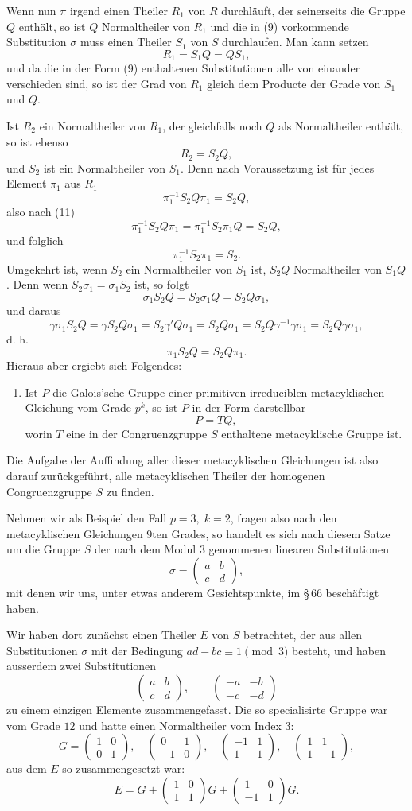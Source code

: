 \documentclass[11pt]{article}
\providecommand{\mat}[4]{\begin{pmatrix}#1&#2\\#3&#4\end{pmatrix}}
\providecommand{\mat}[4]{\begin{pmatrix}#1&#2\\#3&#4\end{pmatrix}}
\begin{document}
Wenn nun $\pi$ irgend einen Theiler $R_1$ von $R$ durchläuft, der seinerseits die Gruppe $Q$ enthält, so ist $Q$ Normaltheiler von $R_1$ und die in (9) vorkommende Substitution $\sigma$ muss einen Theiler $S_1$ von $S$ durchlaufen. Man kann setzen
\[
 R_1=S_1Q=QS_1,
\]
und da die in der Form (9) enthaltenen Substitutionen alle von einander verschieden sind, so ist der Grad von $R_1$ gleich dem Producte der Grade von $S_1$ und $Q$.

Ist $R_2$ ein Normaltheiler von $R_1$, der gleichfalls noch $Q$ als Normaltheiler enthält, so ist ebenso
\[
 R_2=S_2Q,
\]
und $S_2$ ist ein Normaltheiler von $S_1$. Denn nach Voraussetzung ist für jedes Element $\pi_1$ aus $R_1$
\[
 \pi_1^{-1}S_2Q\pi_1=S_2Q,
\]
also nach (11)
\[
 \pi_1^{-1}S_2Q\pi_1
 =\pi_1^{-1}S_2\pi_1 Q=S_2Q,
\]
und folglich
\[
 \pi_1^{-1}S_2\pi_1=S_2.
\]
Umgekehrt ist, wenn $S_2$ ein Normaltheiler von $S_1$ ist, $S_2Q$ Normaltheiler von $S_1Q$. Denn wenn $S_2\sigma_1=\sigma_1S_2$ ist, so folgt
\[
 \sigma_1S_2Q=S_2\sigma_1Q=S_2Q\sigma_1,
\]
und daraus
\[
 \gamma\sigma_1S_2Q=\gamma S_2Q\sigma_1=S_2\gamma'Q\sigma_1
 =S_2Q\sigma_1=S_2Q\gamma^{-1}\gamma\sigma_1=S_2Q\gamma\sigma_1,
\]
d. h.
\[
 \pi_1S_2Q=S_2Q\pi_1.
\]
Hieraus aber ergiebt sich Folgendes:

\begin{enumerate}[label=\Roman*.,leftmargin=2.8em,start=2]
\item Ist $P$ die Galois'sche Gruppe einer primitiven irreduciblen metacyklischen Gleichung vom Grade $p^k$, so ist $P$ in der Form darstellbar
\[
 P=TQ,
\]
worin $T$ eine in der Congruenzgruppe $S$ enthaltene metacyklische Gruppe ist.
\end{enumerate}

Die Aufgabe der Auffindung aller dieser metacyklischen Gleichungen ist also darauf zurückgeführt, alle metacyklischen Theiler der homogenen Congruenzgruppe $S$ zu finden.

Nehmen wir als Beispiel den Fall $p=3,\;k=2$, fragen also nach den metacyklischen Gleichungen $9$ten Grades, so handelt es sich nach diesem Satze um die Gruppe $S$ der nach dem Modul $3$ genommenen linearen Substitutionen
\begin{equation}
 \sigma=\mat{a}{b}{c}{d},
 \tag{12}
\end{equation}
mit denen wir uns, unter etwas anderem Gesichtspunkte, im \S\,66 beschäftigt haben.

Wir haben dort zunächst einen Theiler $E$ von $S$ betrachtet, der aus allen Substitutionen $\sigma$ mit der Bedingung $ad-bc\equiv 1\pmod 3$ besteht, und haben ausserdem zwei Substitutionen
\begin{equation}
 \mat{a}{b}{c}{d},\qquad
 \mat{-a}{-b}{-c}{-d}
 \tag{13}
\end{equation}
zu einem einzigen Elemente zusammengefasst. Die so specialisirte Gruppe war vom Grade $12$ und hatte einen Normaltheiler vom Index $3$:
\[
 G=
 \mat{1}{0}{0}{1},\quad
 \mat{0}{1}{-1}{0},\quad
 \mat{-1}{1}{1}{1},\quad
 \mat{1}{1}{1}{-1},
\]
aus dem $E$ so zusammengesetzt war:
\[
 E=G+\mat{1}{0}{1}{1}G+\mat{1}{0}{-1}{1}G .
\]
\end{document}
